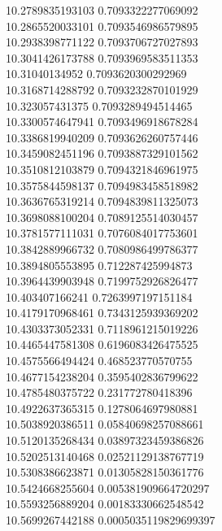 {10.2789835193103 0.7093322277069092 \\
10.2865520033101 0.7093546986579895 \\
10.2938398771122 0.7093706727027893 \\
10.3041426173788 0.7093969583511353 \\
10.31040134952 0.7093620300292969 \\
10.3168714288792 0.7093232870101929 \\
10.323057431375 0.7093289494514465 \\
10.3300574647941 0.7093496918678284 \\
10.3386819940209 0.7093626260757446 \\
10.3459082451196 0.7093887329101562 \\
10.3510812103879 0.7094321846961975 \\
10.3575844598137 0.7094983458518982 \\
10.3636765319214 0.7094839811325073 \\
10.3698088100204 0.7089125514030457 \\
10.3781577111031 0.7076084017753601 \\
10.3842889966732 0.7080986499786377 \\
10.3894805553895 0.712287425994873 \\
10.3964439903948 0.7199752926826477 \\
10.403407166241 0.7263997197151184 \\
10.4179170968461 0.7343125939369202 \\
10.4303373052331 0.7118961215019226 \\
10.4465447581308 0.6196083426475525 \\
10.4575566494424 0.468523770570755 \\
10.4677154238204 0.3595402836799622 \\
10.4785480375722 0.231772780418396 \\
10.4922637365315 0.1278064697980881 \\
10.5038920386511 0.05840698257088661 \\
10.5120135268434 0.03897323459386826 \\
10.5202513140468 0.02521129138767719 \\
10.5308386623871 0.01305828150361776 \\
10.5424668255604 0.005381909664720297 \\
10.5593256889204 0.00183330662548542 \\
10.5699267442188 0.0005035119829699397 \\
}
